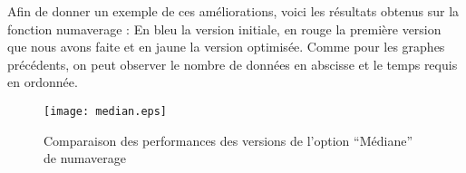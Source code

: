 Afin de donner un exemple de ces am\'eliorations, voici les r\'esultats obtenus sur la fonction numaverage : 
En bleu la version initiale, en rouge la premi\`ere version que nous avons faite et en jaune la version optimis\'ee.
Comme pour les graphes pr\'ec\'edents, on peut observer le nombre de donn\'ees en abscisse et le temps requis en ordonn\'ee.

\begin{figure}[h]
\begin{center}
\texttt{[image: median.eps]}
\end{center}
\caption{Comparaison des performances des versions de l'option ``M\'ediane'' de numaverage}
\label{fig:numprocess}
\end{figure}
